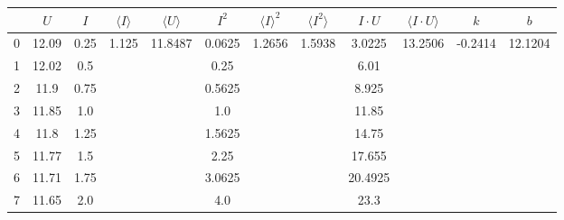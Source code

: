 \documentclass[a4paper,12pt]{article}
\begin{document}
\begin{justify}
\begin{table}[htp]
\begin{adjustwidth}{-0.5cm}{}
\begin{tabular}{|c|c|c|c|c|c|c|c|c|c|c|c|}
\hline
  & $U$   & $I$  & $\langle I\rangle$     & $\langle U\rangle$       & $I^2$  & $\langle I\rangle^2$    & $\langle I^2\rangle$    & $I\cdot U$ & $\langle I\cdot U\rangle$ & $k$                      & $b$                      \\ \hline
0 & 12.09 & 0.25 & \multirow{8}{*}{1.125} & \multirow{8}{*}{11.8487} & 0.0625 & \multirow{8}{*}{1.2656} & \multirow{8}{*}{1.5938} & 3.0225     & \multirow{8}{*}{13.2506}  & \multirow{8}{*}{-0.2414} & \multirow{8}{*}{12.1204} \\ \cline{1-3} \cline{6-6} \cline{9-9}
1 & 12.02 & 0.5  &                        &                          & 0.25   &                         &                         & 6.01       &                           &                          &                          \\ \cline{1-3} \cline{6-6} \cline{9-9}
2 & 11.9  & 0.75 &                        &                          & 0.5625 &                         &                         & 8.925      &                           &                          &                          \\ \cline{1-3} \cline{6-6} \cline{9-9}
3 & 11.85 & 1.0  &                        &                          & 1.0    &                         &                         & 11.85      &                           &                          &                          \\ \cline{1-3} \cline{6-6} \cline{9-9}
4 & 11.8  & 1.25 &                        &                          & 1.5625 &                         &                         & 14.75      &                           &                          &                          \\ \cline{1-3} \cline{6-6} \cline{9-9}
5 & 11.77 & 1.5  &                        &                          & 2.25   &                         &                         & 17.655     &                           &                          &                          \\ \cline{1-3} \cline{6-6} \cline{9-9}
6 & 11.71 & 1.75 &                        &                          & 3.0625 &                         &                         & 20.4925    &                           &                          &                          \\ \cline{1-3} \cline{6-6} \cline{9-9}
7 & 11.65 & 2.0  &                        &                          & 4.0    &                         &                         & 23.3       &                           &                          &                          \\ \hline

\end{tabular}
\end{adjustwidth}
\end{table}
\end{justify}
\end{document}

